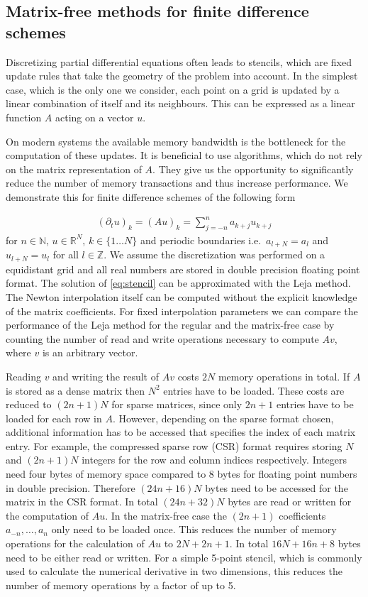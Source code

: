 \documentclass{scrartcl}
\begin{document}
\subsection{Matrix-free methods for finite difference schemes} \label{sec:FDS}
	Discretizing partial differential equations often leads to stencils, which are fixed update rules that take the geometry of the problem into account. In the simplest case, which is the only one we consider, each point on a grid is updated by a linear combination of itself and its neighbours. This can be expressed as a linear function $A$ acting on a vector $u$. 


	On modern systems the available memory bandwidth is the bottleneck for the computation of these updates. It is beneficial to use algorithms, which do not rely on the matrix representation of $A$. They give us the opportunity to significantly reduce the number of memory transactions and thus increase performance. We demonstrate this for finite difference schemes of the following form

	\begin{align}
		(\partial_{t}u)_k = (Au)_k = \sum_{j=-n}^{n} a_{k+j}u_{k+j} \label{eq:stencil}
	\end{align}
	for $n\in\mathbb{N}$, $u\in\mathbb{R}^N$, $k\in\{1\dots N\}$ and periodic boundaries i.e.~$a_{l+N} = a_{l}$ and $u_{l+N}=u_{l}$ for all $l\in\mathbb{Z}$.
	We assume the discretization was performed on a equidistant grid and all real numbers are stored in double precision floating point format.
	The solution of \eqref{eq:stencil} can be approximated with the Leja method. The Newton interpolation itself can be computed without the explicit knowledge of the matrix coefficients. For fixed interpolation parameters we can compare the performance of the Leja method for the regular and the matrix-free case by counting the number of read and write operations necessary to compute $Av$, where $v$ is an arbitrary vector.


	Reading $v$ and writing the result of $Av$ costs $2N$ memory operations in total. If $A$ is stored as a dense matrix then $N^2$ entries have to be loaded. These costs are reduced to $(2n+1)N$ for sparse matrices, since only $2n+1$ entries have to be loaded for each row in $A$. However, depending on the sparse format chosen, additional information has to be accessed that specifies the index of each matrix entry. For example, the compressed sparse row (CSR) format requires storing $N$ and $(2n+1)N$ integers for the row and column indices respectively. Integers need four bytes of memory space compared to 8 bytes for floating point numbers in double precision. Therefore $(24n + 16)N$ bytes need to be accessed for the matrix in the CSR format. In total $(24n + 32)N$ bytes are read or written for the computation of $Au$.
	In the matrix-free case the $(2n+1)$ coefficients $a_{-n}, \dots, a_{n}$ only need to be loaded once. This reduces the number of memory operations for the calculation of $Au$ to $2N + 2n + 1$. In total $16N + 16n + 8$ bytes need to be either read or written. For a simple 5-point stencil, which is commonly used to calculate the numerical derivative in two dimensions, this reduces the number of memory operations by a factor of up to 5.
	
\end{document}

